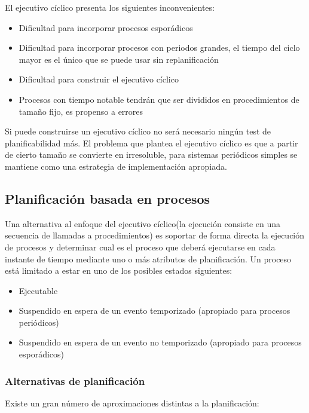 El ejecutivo cíclico presenta los siguientes inconvenientes:

\begin{itemize}
	\item Dificultad para incorporar procesos esporádicos
	\item Dificultad para incorporar procesos con periodos grandes, el
		tiempo del ciclo mayor es el único que se puede usar sin
		replanificación
	\item Dificultad para construir el ejecutivo cíclico
	\item Procesos con tiempo notable tendrán que ser divididos en
		procedimientos de tamaño fijo, es propenso a errores
\end{itemize}

Si puede construirse un ejecutivo cíclico no será necesario ningún test de
planificabilidad más. El problema que plantea el ejecutivo cíclico es que a
partir de cierto tamaño se convierte en irresoluble, para sistemas periódicos
simples se mantiene como una estrategia de implementación apropiada.

\subsection{Planificación basada en procesos}

Una alternativa al enfoque del ejecutivo cíclico(la ejecución consiste en una
secuencia de llamadas a procedimientos) es soportar de forma directa la
ejecución de procesos y determinar cual es el proceso que deberá ejecutarse en
cada instante de tiempo mediante uno o más atributos de planificación. Un
proceso está limitado a estar en uno de los posibles estados siguientes:

\begin{itemize}
	\item Ejecutable
	\item Suspendido en espera de un evento temporizado (apropiado para
		procesos periódicos)
	\item Suspendido en espera de un evento no temporizado (apropiado para
		procesos esporádicos)
\end{itemize}

\subsubsection{Alternativas de planificación}

Existe un gran número de aproximaciones distintas a la planificación:
